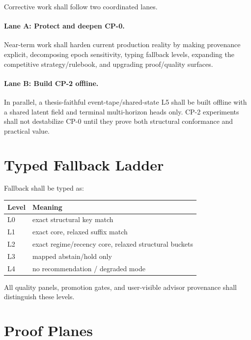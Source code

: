 Corrective work shall follow two coordinated lanes.
\paragraph{Lane A: Protect and deepen CP-0.}
Near-term work shall harden current production reality by making provenance explicit, decomposing epoch sensitivity, typing fallback levels, expanding the competitive strategy/rulebook, and upgrading proof/quality surfaces.

\paragraph{Lane B: Build CP-2 offline.}
In parallel, a thesis-faithful event-tape/shared-state L5 shall be built offline with a shared latent field and terminal multi-horizon heads only. CP-2 experiments shall not destabilize CP-0 until they prove both structural conformance and practical value.

\section{Typed Fallback Ladder}

Fallback shall be typed as:
\begin{longtable}{p{}p{}}
\toprule
Level & Meaning \\
\midrule
L0 & exact structural key match \\
L1 & exact core, relaxed suffix match \\
L2 & exact regime/recency core, relaxed structural buckets \\
L3 & mapped abstain/hold only \\
L4 & no recommendation / degraded mode \\
\bottomrule
\end{longtable}
All quality panels, promotion gates, and user-visible advisor provenance shall distinguish these levels.

\section{Proof Planes}

